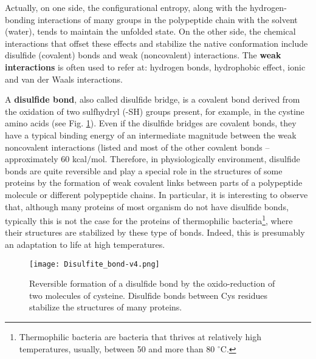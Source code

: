 Actually, on one side, the configurational entropy, along with the hydrogen-bonding interactions of many groups in the polypeptide chain with the solvent (water), tends to maintain the unfolded state. On the other side, the chemical interactions that offset these effects and stabilize the native conformation include disulfide (covalent) bonds and weak (noncovalent) interactions. The \textbf{weak interactions} is often used to refer at: hydrogen bonds, hydrophobic effect, ionic and van der Waals interactions. 

A \textbf{disulfide bond}, also called disulfide bridge, is a covalent bond derived from the oxidation of two sulfhydryl (-SH) groups present, for example, in the cystine amino acids (see Fig. \ref{fig:ss-bond}). Even if the disulfide bridges are covalent bonds, they have a typical binding energy of an intermediate magnitude between the weak noncovalent interactions (listed  and most of the other covalent bonds -- approximately 60 kcal$/$mol. Therefore, in physiologically environment, disulfide bonds are quite reversible and play a special role in the structures of some proteins by the formation of weak covalent links between parts of a polypeptide molecule or different polypeptide chains. In particular, it is interesting to observe that, although many proteins of most organism do not have disulfide bonds, typically this is not the case for the proteins of thermophilic bacteria\footnote{Thermophilic bacteria are bacteria that thrives at relatively high temperatures, usually, between 50 and more than 80 $^\circ$C.}, where their structures are stabilized by these type of bonds. Indeed, this is presumably an adaptation to life at high temperatures. 
\begin{figure}[h]
\centering
\begin{minipage}[t]{0.8\textwidth}
\centering
\texttt{[image: Disulfite\_bond-v4.png]}

\caption{\small{Reversible formation of a disulfide bond by the oxido-reduction of two molecules of cysteine. Disulfide bonds between Cys residues stabilize the structures of many proteins.}}

\label{fig:ss-bond}
\end{minipage} 
\end{figure}

